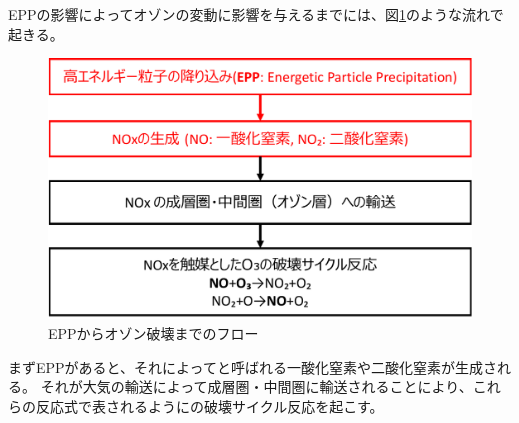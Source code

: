 EPPの影響によってオゾンの変動に影響を与えるまでには、図\ref{fig:epp_to_ozone_flow}のような流れで起きる。
\begin{figure}[htbp]
    \centering
    \includegraphics[width=\linewidth]{master_thesis_contents/master_thesis_fig/epp_to_ozone_flow.pdf}
    \caption{EPPからオゾン破壊までのフロー}
    \label{fig:epp_to_ozone_flow}
\end{figure}
まずEPPがあると、それによってと呼ばれる一酸化窒素や二酸化窒素が生成される。
それが大気の輸送によって成層圏・中間圏に輸送されることにより、これらの反応式で表されるようにの破壊サイクル反応を起こす。


